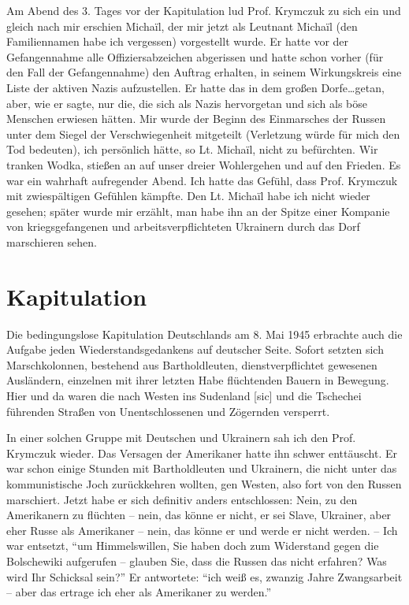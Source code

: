Am Abend des 3. Tages vor der Kapitulation lud Prof. Krymczuk zu sich ein und gleich nach mir erschien Michaïl, der mir jetzt als Leutnant Michaïl (den Familiennamen habe ich vergessen) vorgestellt wurde. Er hatte vor der Gefangennahme alle Offiziersabzeichen abgerissen und hatte schon vorher (für den Fall der Gefangennahme) den Auftrag erhalten, in seinem Wirkungskreis eine Liste der aktiven Nazis aufzustellen. Er hatte das in dem großen Dorfe\dots getan, aber, wie er sagte, nur die,  die sich als Nazis hervorgetan und sich als böse Menschen erwiesen hätten. Mir wurde der Beginn des Einmarsches der Russen unter dem Siegel der Verschwiegenheit mitgeteilt (Verletzung würde für mich den Tod bedeuten), ich persönlich hätte, so Lt. Michaïl, nicht zu befürchten. Wir tranken Wodka, stießen an auf unser dreier Wohlergehen und auf den Frieden. Es war ein wahrhaft aufregender Abend. Ich hatte das Gefühl, dass Prof. Krymczuk mit zwiespältigen Gefühlen kämpfte. Den Lt. Michaïl habe ich nicht wieder gesehen; später wurde mir erzählt, man habe ihn an der Spitze einer Kompanie von kriegsgefangenen und arbeitsverpflichteten Ukrainern durch das Dorf marschieren sehen.

\section{Kapitulation}

Die bedingungslose Kapitulation Deutschlands am 8. Mai 1945 erbrachte auch die Aufgabe jeden Wiederstandsgedankens auf deutscher Seite. Sofort setzten sich Marschkolonnen, bestehend aus Bartholdleuten, dienstverpflichtet gewesenen Ausländern, einzelnen mit ihrer letzten Habe flüchtenden Bauern in Bewegung. Hier und da waren die nach Westen ins Sudenland [sic] und die Tschechei führenden Straßen von Unentschlossenen und Zögernden versperrt.

In einer solchen Gruppe mit Deutschen und Ukrainern sah ich den Prof. Krymczuk wieder.  Das Versagen der Amerikaner hatte ihn schwer enttäuscht. Er war schon einige Stunden mit Bartholdleuten und Ukrainern, die nicht unter das kommunistische Joch zurückkehren wollten, gen Westen, also fort von den Russen marschiert. Jetzt habe er sich definitiv anders entschlossen: Nein, zu den Amerikanern zu flüchten -- nein, das könne er nicht, er sei Slave, Ukrainer, aber eher Russe als Amerikaner -- nein, das könne er und werde er nicht werden. -- Ich war entsetzt, \enquote{um Himmelswillen, Sie haben doch zum Widerstand gegen die Bolschewiki aufgerufen -- glauben Sie, dass die Russen das nicht erfahren? Was wird Ihr Schicksal sein?} Er antwortete: \enquote{ich weiß es, zwanzig Jahre Zwangsarbeit -- aber das ertrage ich eher als Amerikaner zu werden.}

